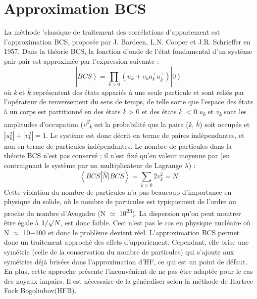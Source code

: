 \section{Approximation BCS}
 La méthode {\textquotedbl}'classique{\textquotedbl} de traitement des corrélations d'appariement est
l'approximation BCS, proposée par J. Bardeen, L.N. Cooper et J.R. Schrieffer en 1957. Dans la théorie BCS, la fonction
d'onde de l'état fondamental d'un système pair-pair est approximée par l'expression suivante :
 \begin{equation}| \left.\mathit{BCS}\right\rangle
=\prod _{k>0} (u_k+v_k a_k^+ a_{\overline k}^+  )| \left.0\right\rangle
\end{equation}
où\textit{ k} et $\overline k$ représentent des états appariés à une seule particule et sont reliés par l'opérateur de
renversement du sens de temps, de telle sorte que l'espace des états à un corps est partitionné en des états \textit{k
}{\textgreater} 0 et des états $\overline k$\ {\textless} 0.\textit{u}\textit{\textsubscript{k}} et
\textit{v}\textit{\textsubscript{k}}\textsubscript{ }sont les amplitudes d'occupation
({\textbar}\textit{v}\textit{\textsuperscript{2}}\textit{\textsubscript{k}}{\textbar} est la probabilité que la paire
(\textit{k}, $\overline k$) soit occupée et $\left|\left.u_k^2\right|+\left|v_k^2\right.\right|=1$.
 Le système est donc décrit en terme de paires indépendantes, et non en terme de particules indépendantes.
 Le nombre de particules dans la théorie BCS n'est pas conservé ; il n'est fixé qu'en valeur moyenne par
(en contraignant le système par un multiplicateur de Lagrange $\lambda $) :
\begin{equation}\left\langle
\mathit{BCS}\left|\widehat N\left|\mathit{BCS}\right.\right.\right\rangle =\sum
_{k>0}2v_k^2=N\end{equation}
 Cette violation du nombre de particules n'a pas beaucoup d'importance en physique du solide, où le nombre
de particules est typiquement de l'ordre ou proche du nombre d'Avogadro (N ${\simeq}$ 10\textsuperscript{23}). La
dispersion qu'on peut montrer être égale à $1/{\surd}N$, est donc faible. Ceci n'est pas le cas en physique nucléaire
où N ${\approx}$ 10$-$100 et donc le problème devient réel.
 L'approximation BCS permet donc un traitement approché des effets d'appariement. Cependant, elle brise une
symétrie (celle de la conservation du nombre de particules) qui s'ajoute aux symétries déjà brisées dans
l'approximation d'HF, ce qui est un point de défaut. En plus, cette approche présente l'inconvénient de ne pas être
adaptée pour le cas des noyaux impairs. Il est nécessaire de la généraliser selon la méthode de Hartree Fock
Bogoliubov(HFB).
